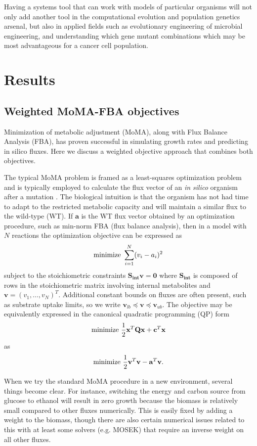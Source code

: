 Having a systems tool that can work with models of particular organisms
will not only add another tool in the computational evolution and
population genetics arsenal, but also in applied fields such as
evolutionary engineering of microbial engineering, and understanding
which gene mutant combinations which may be most advantageous for
a cancer cell population.

\section{Results}

\subsection{Weighted MoMA-FBA objectives}

Minimization of metabolic adjustment (MoMA), along with Flux Balance
Analysis (FBA), has proven successful in simulating growth rates and
predicting in silico fluxes. Here we discuss a weighted objective
approach that combines both objectives. 

The typical MoMA problem is framed as a least-squares optimization
problem and is typically employed to calculate the flux vector of an
\emph{in silico} organism after a mutation \cite{Segre2002_sb2013}.
The biological intuition is that the organism has not had time to
adapt to the restricted metabolic capacity and will maintain a similar
flux to the wild-type (WT). If $\mathbf{a}$ is the WT flux vector
obtained by an optimization procedure, such as min-norm FBA (flux
balance analysis), then in a model with $N$ reactions the optimization
objective can be expressed as
\[ \textnormal{minimize}\ \sum^N_{i=1}(v_i-a_i)^2 \] 
subject to the stoichiometric constraints $\mathbf{S_{int} v} =
\mathbf{0}$ where $\mathbf{S_{int}}$ is composed of rows in the
stoichiometric matrix involving internal metabolites and $\mathbf{v} =
(v_1, \ldots, v_N)^T$.  Additional constant bounds on fluxes are often
present, such as substrate uptake limits, so we write $\mathbf{v}_{lb}
\preceq \mathbf{v} \preceq \mathbf{v}_{ub}$. The objective may be
equivalently expressed in the canonical quadratic programming (QP)
form
\[ \textnormal{minimize}\ \frac{1}{2}\mathbf{x}^T \mathbf{Q x} + \mathbf{c}^T \mathbf{x}\]
as  
\[ \textnormal{minimize}\ \frac{1}{2}\mathbf{v}^T \mathbf{v} - \mathbf{a}^T \mathbf{v}\textnormal{.}\]

When we try the standard MoMA procedure in a new environment, several
things become clear. For instance, switching the energy and carbon
source from glucose to ethanol will result in zero growth because the
biomass is relatively small compared to other fluxes numerically.
This is easily fixed by adding a weight to the biomass, though there
are also certain numerical issues related to this with at least some
solvers (e.g. MOSEK) that require an inverse weight on all other
fluxes.

